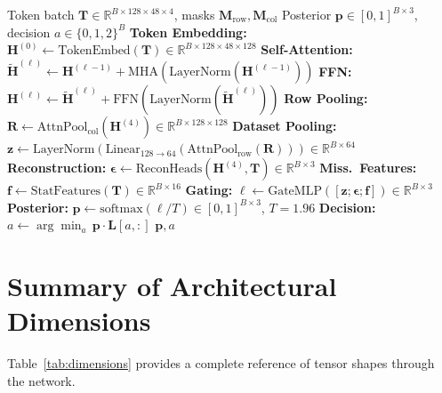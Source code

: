 \documentclass[11pt]{article}
\newcommand{\RR}{\mathbb{R}}
\newcommand{\layernorm}{\text{LayerNorm}}
\newcommand{\softmax}{\text{softmax}}
\newcommand{\ffn}{\text{FFN}}
\newcommand{\lacuna}{\textsc{Lacuna}}
\begin{document}
\begin{algorithm}[h]
\caption{\lacuna{} Forward Pass (Base Configuration)}
\label{alg:forward}
\begin{algorithmic}[1]
\Require Token batch $\mathbf{T} \in \RR^{B \times 128 \times 48 \times 4}$, masks $\mathbf{M}_{\text{row}}, \mathbf{M}_{\text{col}}$
\Ensure Posterior $\mathbf{p} \in [0,1]^{B \times 3}$, decision $a \in \{0,1,2\}^B$
\State \textbf{Token Embedding:} $\mathbf{H}^{(0)} \gets \text{TokenEmbed}(\mathbf{T}) \in \RR^{B \times 128 \times 48 \times 128}$
    \State \textbf{Self-Attention:} $\tilde{\mathbf{H}}^{(\ell)} \gets \mathbf{H}^{(\ell-1)} + \text{MHA}(\layernorm(\mathbf{H}^{(\ell-1)}))$
    \State \textbf{FFN:} $\mathbf{H}^{(\ell)} \gets \tilde{\mathbf{H}}^{(\ell)} + \ffn(\layernorm(\tilde{\mathbf{H}}^{(\ell)}))$
\EndFor
\State \textbf{Row Pooling:} $\mathbf{R} \gets \text{AttnPool}_{\text{col}}(\mathbf{H}^{(4)}) \in \RR^{B \times 128 \times 128}$
\State \textbf{Dataset Pooling:} $\mathbf{z} \gets \layernorm(\text{Linear}_{128 \to 64}(\text{AttnPool}_{\text{row}}(\mathbf{R}))) \in \RR^{B \times 64}$
\State \textbf{Reconstruction:} $\bm{\epsilon} \gets \text{ReconHeads}(\mathbf{H}^{(4)}, \mathbf{T}) \in \RR^{B \times 3}$
\State \textbf{Miss.\ Features:} $\mathbf{f} \gets \text{StatFeatures}(\mathbf{T}) \in \RR^{B \times 16}$
\State \textbf{Gating:} $\bm{\ell} \gets \text{GateMLP}([\mathbf{z}; \bm{\epsilon}; \mathbf{f}]) \in \RR^{B \times 3}$
\State \textbf{Posterior:} $\mathbf{p} \gets \softmax(\bm{\ell} / T) \in [0,1]^{B \times 3}$, \quad $T = 1.96$
\State \textbf{Decision:} $a \gets \arg\min_a \, \mathbf{p} \cdot \mathbf{L}[a, :]$
\State \Return $\mathbf{p}, a$
\end{algorithmic}
\end{algorithm}

\section{Summary of Architectural Dimensions}
\label{sec:dimensions}

Table~\ref{tab:dimensions} provides a complete reference of tensor shapes through the network.
\end{document}
